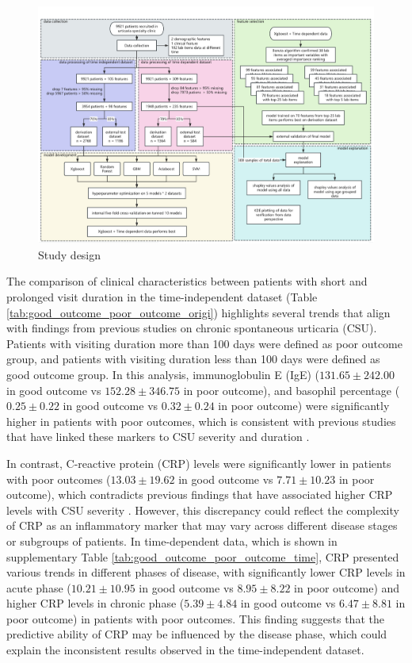 \documentclass[final,3p,times,authoryear]{elsarticle}
\begin{document}
\begin{figure}[t]
    \centering
    \includegraphics[width=0.8\linewidth]{figures/protocol.png}
    \caption{Study design}\label{protocol}
\end{figure}

The comparison of clinical characteristics between patients with short and prolonged visit duration in the time-independent dataset (Table \ref{tab:good_outcome_poor_outcome_origi}) highlights several trends that align with findings from previous studies on chronic spontaneous urticaria (CSU).
Patients with visiting duration more than 100 days were defined as poor outcome group, and patients with visiting duration less than 100 days were defined as good outcome group. In this analysis, immunoglobulin E (IgE) ($131.65 \pm 242.00$ in good outcome vs $152.28 \pm 346.75$ in poor outcome), and basophil percentage ($0.25 \pm 0.22$ in good outcome vs $0.32 \pm 0.24$ in poor outcome) were significantly higher in patients with poor outcomes, which is consistent with previous studies that have linked these markers to CSU severity and duration \citep{SanchezBorges2017Factors,Rabelo-Filardi2013Parameters}. 

In contrast, C-reactive protein (CRP) levels were significantly lower in patients with poor outcomes ($13.03 \pm 19.62$ in good outcome vs $7.71 \pm 10.23$ in poor outcome), which contradicts previous findings that have associated higher CRP levels with CSU severity \citep{Rabelo-Filardi2013Parameters}. However, this discrepancy could reflect the complexity of CRP as an inflammatory marker that may vary across different disease stages or subgroups of patients. In time-dependent data, which is shown in supplementary Table \ref{tab:good_outcome_poor_outcome_time}, CRP presented various trends in different phases of disease, with significantly lower CRP levels in acute phase ($10.21 \pm 10.95$ in good outcome vs $8.95 \pm 8.22$ in poor outcome) and higher CRP levels in chronic phase ($5.39 \pm 4.84$ in good outcome vs $6.47 \pm 8.81$ in poor outcome) in patients with poor outcomes. This finding suggests that the predictive ability of CRP may be influenced by the disease phase, which could explain the inconsistent results observed in the time-independent dataset.
\end{document}

